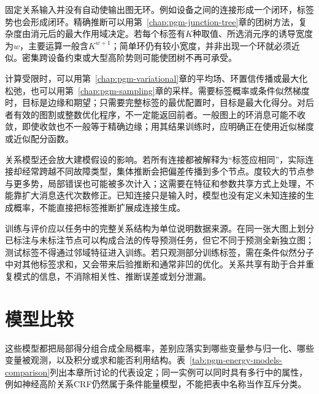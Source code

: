 固定关系输入并没有自动使输出图无环。例如设备之间的连接形成一个闭环，标签势也会形成闭环。精确推断可以用第~\ref{chap:pgm-junction-tree}章的团树方法，复杂度由消元后的最大作用域决定。若每个标签有$K$种取值、所选消元序的诱导宽度为$w$，主要运算一般含$K^{w+1}$；简单环仍有较小宽度，并非出现一个环就必须近似。密集跨设备约束或大型高阶势则可能使团树不再可承受。

计算受限时，可以用第~\ref{chap:pgm-variational}章的平均场、环置信传播或最大化松弛，也可以用第~\ref{chap:pgm-sampling}章的采样。需要标签概率或条件似然梯度时，目标是边缘和期望；只需要完整标签的最优配置时，目标是最大化得分。对后者有效的图割或整数优化程序，不一定能返回前者。一般图上的环消息可能不收敛，即使收敛也不一般等于精确边缘；用其结果训练时，应明确正在使用近似梯度或近似配分函数。

关系模型还会放大建模假设的影响。若所有连接都被解释为“标签应相同”，实际连接却经常跨越不同故障类型，集体推断会把偏差传播到多个节点。度较大的节点参与更多势，局部错误也可能被多次计入；这需要在特征和参数共享方式上处理，不能靠扩大消息迭代次数修正。已知连接只是输入时，模型也没有定义未知连接的生成概率，不能直接把标签推断扩展成连接生成。

训练与评价应以任务中的完整关系结构为单位说明数据来源。在同一张大图上划分已标注与未标注节点可以构成合法的传导预测任务，但它不同于预测全新独立图；测试标签不得通过邻域特征进入训练。若只观测部分训练标签，需在条件似然分子中对其他标签求和，又会带来后验推断和通常非凹的优化。关系共享有助于合并重复模式的信息，不消除相关性、推断误差或划分泄漏。

\section{模型比较}
\label{sec:pgm-energy-models-comparison}

这些模型都把局部得分组合成全局概率，差别应落实到哪些变量参与归一化、哪些变量被观测，以及积分或求和能否利用结构。表~\ref{tab:pgm-energy-models-comparison}列出本章所讨论的代表设定；同一实例可以同时具有多行中的属性，例如神经高阶关系CRF仍然属于条件能量模型，不能把表中名称当作互斥分类。

